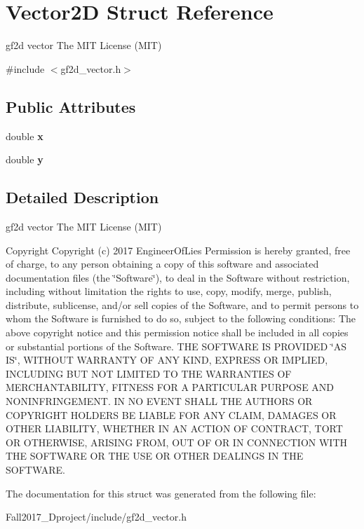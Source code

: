 \hypertarget{struct_vector2_d}{}\section{Vector2D Struct Reference}
\label{struct_vector2_d}


gf2d vector  The M\+IT License (M\+IT)  




{\ttfamily \#include $<$gf2d\+\_\+vector.\+h$>$}

\subsection*{Public Attributes}
\begin{DoxyCompactItemize}
\item 
\mbox{\label{struct_vector2_d_ac5c4e553815737aa24bec8281270178f}} 
double {\bfseries x}
\item 
\mbox{\label{struct_vector2_d_ac38d0179cfe74c30fee290a703ab209a}} 
double {\bfseries y}
\end{DoxyCompactItemize}


\subsection{Detailed Description}
gf2d vector  The M\+IT License (M\+IT) 

\begin{DoxyCopyright}{Copyright}
Copyright (c) 2017 Engineer\+Of\+Lies Permission is hereby granted, free of charge, to any person obtaining a copy of this software and associated documentation files (the \char`\"{}\+Software\char`\"{}), to deal in the Software without restriction, including without limitation the rights to use, copy, modify, merge, publish, distribute, sublicense, and/or sell copies of the Software, and to permit persons to whom the Software is furnished to do so, subject to the following conditions\+: The above copyright notice and this permission notice shall be included in all copies or substantial portions of the Software. T\+HE S\+O\+F\+T\+W\+A\+RE IS P\+R\+O\+V\+I\+D\+ED \char`\"{}\+A\+S I\+S\char`\"{}, W\+I\+T\+H\+O\+UT W\+A\+R\+R\+A\+N\+TY OF A\+NY K\+I\+ND, E\+X\+P\+R\+E\+SS OR I\+M\+P\+L\+I\+ED, I\+N\+C\+L\+U\+D\+I\+NG B\+UT N\+OT L\+I\+M\+I\+T\+ED TO T\+HE W\+A\+R\+R\+A\+N\+T\+I\+ES OF M\+E\+R\+C\+H\+A\+N\+T\+A\+B\+I\+L\+I\+TY, F\+I\+T\+N\+E\+SS F\+OR A P\+A\+R\+T\+I\+C\+U\+L\+AR P\+U\+R\+P\+O\+SE A\+ND N\+O\+N\+I\+N\+F\+R\+I\+N\+G\+E\+M\+E\+NT. IN NO E\+V\+E\+NT S\+H\+A\+LL T\+HE A\+U\+T\+H\+O\+RS OR C\+O\+P\+Y\+R\+I\+G\+HT H\+O\+L\+D\+E\+RS BE L\+I\+A\+B\+LE F\+OR A\+NY C\+L\+A\+IM, D\+A\+M\+A\+G\+ES OR O\+T\+H\+ER L\+I\+A\+B\+I\+L\+I\+TY, W\+H\+E\+T\+H\+ER IN AN A\+C\+T\+I\+ON OF C\+O\+N\+T\+R\+A\+CT, T\+O\+RT OR O\+T\+H\+E\+R\+W\+I\+SE, A\+R\+I\+S\+I\+NG F\+R\+OM, O\+UT OF OR IN C\+O\+N\+N\+E\+C\+T\+I\+ON W\+I\+TH T\+HE S\+O\+F\+T\+W\+A\+RE OR T\+HE U\+SE OR O\+T\+H\+ER D\+E\+A\+L\+I\+N\+GS IN T\+HE S\+O\+F\+T\+W\+A\+RE. 
\end{DoxyCopyright}


The documentation for this struct was generated from the following file\+:\begin{DoxyCompactItemize}
\item 
Fall2017\+\_\+Dproject/include/gf2d\+\_\+vector.\+h\end{DoxyCompactItemize}
